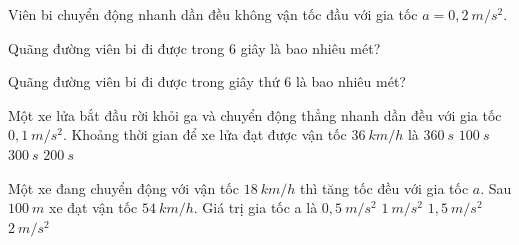 \begin{vidu}%
Viên bi chuyển động nhanh dần đều không vận tốc đầu với gia tốc $a = 0,2\ m/s^2$.
\begin{vdc}
Quãng đường viên bi đi được trong $6$ giây là bao nhiêu mét?
\end{vdc}
\begin{vdc}
Quãng đường viên bi đi được trong giây thứ $6$ là bao nhiêu mét?
\end{vdc}
\end{vidu}

\begin{vidu}%
Một xe lửa bắt đầu rời khỏi ga và chuyển động thẳng nhanh dần đều với gia tốc $0,1\ m/s^2$. Khoảng thời gian để xe lửa đạt được vận tốc $36\ km/h$ là
\choice
{$360\ s$}
{\True $100\ s$}
{$300\ s$}
{$200\ s$}	
\end{vidu}

\begin{vidu}%
Một xe đang chuyển động với vận tốc $18\ km/h$ thì tăng tốc đều với gia tốc $a$. Sau $100\ m$ xe đạt vận tốc $54\ km/h$. Giá trị gia tốc a là
\choice
{$0,5\ m/s^2$}
{\True $1\ m/s^2$}
{$1,5\ m/s^2$}
{$2\ m/s^2$}	
\end{vidu}

